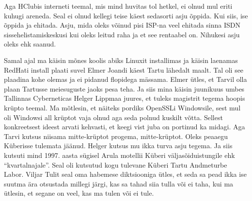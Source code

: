 Aga HClubis interneti teemal, mis mind huvitas tol hetkel, ei olnud mul eriti kuhugi areneda. Seal ei olnud kellegi teise käest sedasorti asju õppida. Kui siis, ise õppida ja ehitada. Asju, mida oleks võinud pisi ISP-na veel ehitada sinna ISDN sissehelistamiskeskusi kui oleks leitud raha ja et see rentaabel on. Nihukesi asju oleks ehk saanud. 

Samal ajal ma käisin mõnes koolis abiks Linuxit installimas ja käisin laenamas RedHati install plaati suvel Elmer Joandi käest Tartu lähedalt maalt. Tal oli see plaadina kohe olemas ja ei pidanud flopidega mässama. Elmer ütles, et Tarvil olla plaan Tartusse meiesuguste jaoks pesa teha. Ja siis mina käisin juunikuus umbes Tallinnas Cyberneticas Helger Lippmaa  juures, et tuleks magistrit tegema hoopis krüpto teemal. Ma mõtlesin, et näiteks pordiks OpenSSLi Windowsile, sest mul oli Windowsi all krüptot vaja olnud aga seda polnud kuskilt võtta. Sellest konkreetsest ideest arvati kehvasti, et keegi vist juba on portinud ka midagi. Aga Tarvi kutsus niisama mitte-krüptot progema, mitte-krüptot. Oleks peaaegu Küberisse tulemata jäänud. Helger kutsus mu ikka turva asju tegema. Ja siis kutsuti mind 1997. aasta sügisel Arula motellii Küberi väljasõiduistungile ehk \enquote{kvartalnajale}. Seal oli kutsutud kogu tulevane Küberi Tartu Andmeturbe Labor. Viljar Tulit seal oma habemese diktsiooniga ütles, et seda sa pead ikka ise suutma ära otsustada millegi järgi, kas sa tahad siia tulla või ei taha, kui ma ütlesin, et segane on veel, kas ma tulen või ei tule. 

